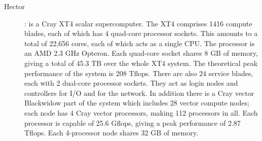\begin{description}
\item[Hector]: is a Cray XT4 scalar supercomputer. The XT4 comprises 1416 compute blades, each of which has 4 quad-core processor sockets. This amounts to a total of 22,656 cores, each of which acts as a single CPU. The processor is an AMD 2.3 GHz Opteron. Each quad-core socket shares 8 GB of memory, giving a total of 45.3 TB over the whole XT4 system. The theoretical peak performance of the system is 208 Tflops. There are also 24 service blades, each with 2 dual-core processor sockets. They act as login nodes and controllers for I/O and for the network. In addition there is a Cray vector Blackwidow part of the system which includes 28 vector compute nodes; each node has 4 Cray vector processors, making 112 processors in all. Each processor is capable of 25.6 Gflops, giving a peak performance of 2.87 Tflops. Each 4-processor node shares 32 GB of memory.
\end{description}
